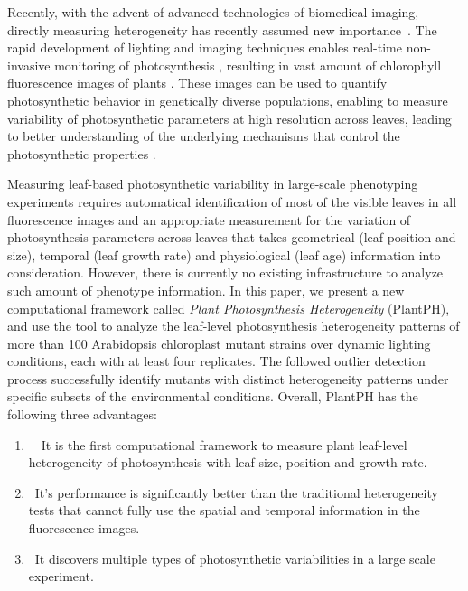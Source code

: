 \documentclass{bioinfo}
\begin{document}
Recently, with the advent of advanced technologies of biomedical imaging, directly measuring heterogeneity has recently assumed new importance~\citep{tiihonen1996cerebral,wieneke1999non,wang2000,cruz2014depi}. The rapid development of lighting and imaging techniques enables real-time non-invasive monitoring of photosynthesis \citep{houle2010phenomics,cruz2014depi}, resulting in vast amount of chlorophyll fluorescence images of plants \citep{wituszynska2013multivariable}. These images can be used to quantify photosynthetic behavior in genetically diverse populations, enabling to measure variability of photosynthetic parameters at high resolution across leaves, leading to better understanding of the underlying mechanisms that control the photosynthetic properties \citep{rascher2011non,fiorani2013future}. %

Measuring leaf-based photosynthetic variability in large-scale phenotyping experiments requires automatical identification of most of the visible leaves in all fluorescence images and an appropriate measurement for the variation of photosynthesis parameters across leaves that takes geometrical (leaf position and size), temporal (leaf growth rate) and physiological (leaf age) information into consideration. However, there is currently no existing infrastructure to analyze such amount of phenotype information. %
%
In this paper, we present a new computational framework called {\it Plant Photosynthesis Heterogeneity} (PlantPH), and use the tool to analyze the leaf-level photosynthesis heterogeneity patterns of more than 100 Arabidopsis chloroplast mutant strains over dynamic lighting conditions, each with at least four replicates. The followed outlier detection process successfully identify mutants with distinct heterogeneity patterns under specific subsets of the environmental conditions.
%
Overall, PlantPH has the following three advantages: %
\begin{enumerate}\vspace{-0.1in}
  \item~~It is the first computational framework to measure plant leaf-level heterogeneity of photosynthesis with leaf size, position and growth rate.
  \item~It's performance is significantly better than the traditional heterogeneity tests that cannot fully use the spatial and temporal information in the fluorescence images.
  \item~It discovers multiple types of photosynthetic variabilities in a large scale experiment.
\end{enumerate}
\end{document}

